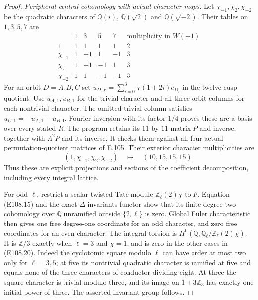 \begin{proof}
\emph{Peripheral central cohomology with actual character maps.}
Let $\chi_{-1},\chi_2,\chi_{-2}$ be the quadratic characters
of $\mathbb Q(i)$, $\mathbb Q(\sqrt2)$ and
$\mathbb Q(\sqrt{-2})$.  Their tables on $1,3,5,7$ are
\[
 \begin{array}{c|rrrr|r}
       &1&3&5&7&\text{multiplicity in }W(-1)\\ \hline
 1&1&1&1&1&2\\
 \chi_{-1}&1&-1&1&-1&3\\
 \chi_2&1&-1&-1&1&3\\
 \chi_{-2}&1&1&-1&-1&3
 \end{array}
 \tag{E108.20}
\]
For an orbit $D=A,B,C$ set
$u_{D,\chi}=\sum_{i=0}^3\chi(1+2i)e_{D_i}$ in the
twelve-cusp quotient.  Use $u_{A,1},u_{B,1}$ for the
trivial character and all three orbit columns for each
nontrivial character.  The omitted trivial column satisfies
$u_{C,1}=-u_{A,1}-u_{B,1}$.  Fourier inversion with its
factor $1/4$ proves these are a basis over every stated $R$.
The program retains its $11$ by $11$ matrix $P$ and
inverse, together with $\Lambda^2P$ and its inverse.
It checks them against all four actual permutation-quotient
matrices of E.105.  Their exterior character multiplicities
are
\[
           (1,\chi_{-1},\chi_2,\chi_{-2})
                         \quad\longmapsto\quad(10,15,15,15).
 \tag{E108.21}
\]
Thus these are explicit projections and sections of the
coefficient decomposition, including every integral lattice.

For odd $\ell$, restrict a scalar twisted Tate module
$\mathbb Z_\ell(2)\chi$ to $F$.  Equation (E108.15) and
the exact $\Delta$-invariants functor show that its finite
degree-two cohomology over $\mathbb Q$ unramified outside
$\{2,\ell\}$ is zero.  Global Euler characteristic then
gives one free degree-one coordinate for an odd character,
and zero free coordinates for an even character.  The
integral torsion is
$H^0(\mathbb Q,\mathbb Q_\ell/\mathbb Z_\ell(2)\chi)$.
It is $\mathbb Z/3$ exactly when $\ell=3$ and $\chi=1$,
and is zero in the other cases in (E108.20).
Indeed the cyclotomic square modulo $\ell$ can have order
at most two only for $\ell=3,5$; at five its nontrivial
quadratic character is ramified at five and equals none
of the three characters of conductor dividing eight.
At three the square character is trivial modulo three,
and its image on $1+3\mathbb Z_3$ has exactly one initial
power of three.  The asserted invariant group follows.


\end{proof}
